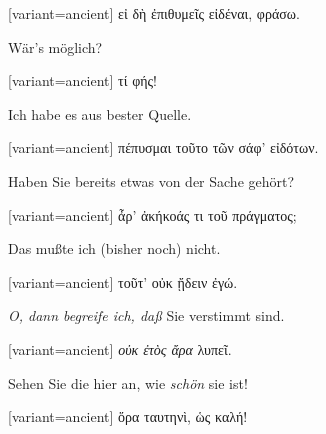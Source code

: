 \begin{greek}[variant=ancient]%
εἰ δὴ ἐπιθυμεῖς εἰδέναι, φράσω.

\end{greek}%
\switchcolumn*

Wär's möglich? 

\switchcolumn

\begin{greek}[variant=ancient]%
τί φής!

\end{greek}%
\switchcolumn*

Ich habe es aus bester Quelle. 

\switchcolumn

\begin{greek}[variant=ancient]%
πέπυσμαι τοῦτο τῶν σάφ' εἰδότων.

\end{greek}%
\switchcolumn*

Haben Sie bereits etwas von der Sache gehört? 

\switchcolumn

\begin{greek}[variant=ancient]%
ἆρ' ἀκήκοάς τι τοῦ πράγματος;

\end{greek}%
\switchcolumn*

Das mußte ich (bis\textcompwordmark{}her noch) nicht.

\switchcolumn

\begin{greek}[variant=ancient]%
τοῦτ' οὐκ ᾔδειν ἐγώ.

\end{greek}%
\switchcolumn*

\emph{O, dann begreife ich, daß} Sie verstimmt sind.

\switchcolumn

\begin{greek}[variant=ancient]%
\emph{οὐκ ἐτὸς ἄρα} λυπεῖ.

\end{greek}%
Sehen Sie die hier an, wie \emph{schön} sie ist! 

\switchcolumn

\begin{greek}[variant=ancient]%
ὅρα ταυτηνὶ, ὡς καλή!

\end{greek}%
\switchcolumn*

